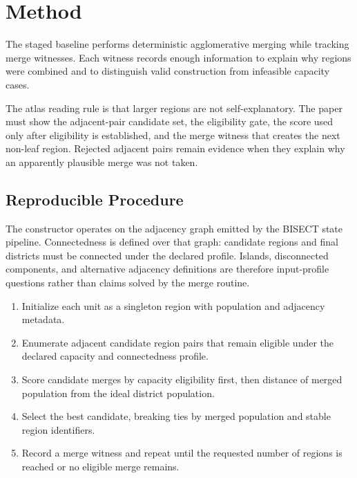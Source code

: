 \section{Method}

The staged baseline performs deterministic agglomerative merging while tracking
merge witnesses. Each witness records enough information to explain why regions
were combined and to distinguish valid construction from infeasible capacity
cases.

The atlas reading rule is that larger regions are not self-explanatory. The
paper must show the adjacent-pair candidate set, the eligibility gate, the
score used only after eligibility is established, and the merge witness that
creates the next non-leaf region. Rejected adjacent pairs remain evidence when
they explain why an apparently plausible merge was not taken.

\subsection{Reproducible Procedure}

The constructor operates on the adjacency graph emitted by the BISECT state
pipeline. Connectedness is defined over that graph: candidate regions and final
districts must be connected under the declared profile. Islands, disconnected
components, and alternative adjacency definitions are therefore input-profile
questions rather than claims solved by the merge routine.

\begin{enumerate}
  \item Initialize each unit as a singleton region with population and
        adjacency metadata.
  \item Enumerate adjacent candidate region pairs that remain eligible under
        the declared capacity and connectedness profile.
  \item Score candidate merges by capacity eligibility first, then distance of
        merged population from the ideal district population.
  \item Select the best candidate, breaking ties by merged population and
        stable region identifiers.
  \item Record a merge witness and repeat until the requested number of
        regions is reached or no eligible merge remains.
\end{enumerate}

